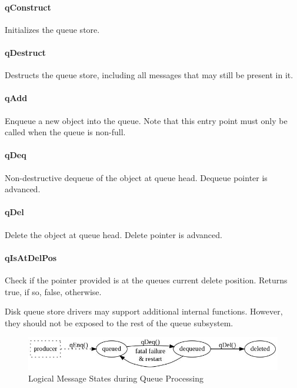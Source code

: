\documentclass[a4paper,10pt]{article}
\begin{document}
\paragraph{qConstruct} Initializes the queue store.

\paragraph{qDestruct} Destructs the queue store, including all messages that may still be present in it.

\paragraph{qAdd} Enqueue a new object into the queue. Note that this entry point must only be called when the queue is non-full.

\paragraph{qDeq} Non-destructive dequeue of the object at queue head. Dequeue pointer is advanced.

\paragraph{qDel} Delete the object at queue head. Delete pointer is advanced.

\paragraph{qIsAtDelPos} Check if the pointer provided is at the queues current delete position. Returns true, if so, false, otherwise.

Disk queue store drivers may support additional internal functions. However, they should not be exposed to the rest of the queue subsystem.

\begin{figure}
\begin{center}
\includegraphics[scale=0.4]{queue_msg_state.jpeg}
\end{center}
\caption{Logical Message States during Queue Processing}
\label{fig_queue_msg_state}
\end{figure}
\end{document}
